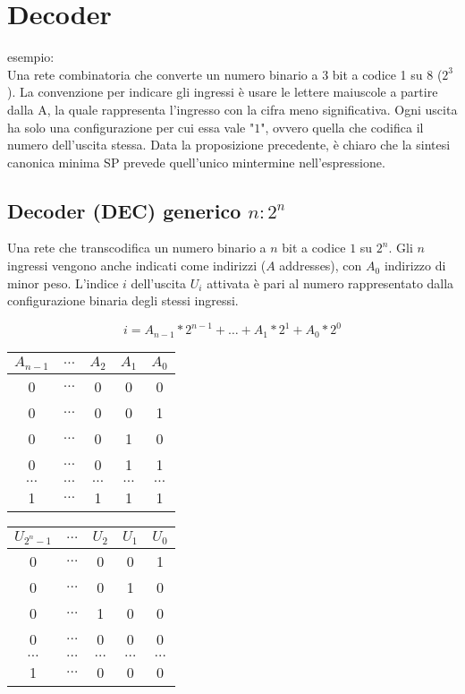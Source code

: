 \documentclass{subfiles}
\begin{document}
\section{Decoder}

esempio:\\

\noindent
Una rete combinatoria che converte un numero binario a 3 bit a codice 1 su 8 ($2^3$).
La convenzione per indicare gli ingressi è usare le lettere maiuscole a partire dalla A, la quale rappresenta l'ingresso con la cifra meno significativa.
Ogni uscita ha solo una configurazione per cui essa vale "$1$", ovvero quella che codifica il numero dell'uscita stessa.
Data la proposizione precedente, è chiaro che la sintesi canonica minima SP prevede quell'unico mintermine nell'espressione.

\subsection{Decoder (DEC) generico $n:2^n$}

Una rete che transcodifica un numero binario a $n$ bit a codice $1$ su $2^n$.
Gli $n$ ingressi vengono anche indicati come indirizzi ($A$ addresses), con $A_0$ indirizzo di minor peso.
L'indice $i$ dell'uscita $U_i$ attivata è pari al numero rappresentato dalla configurazione binaria degli stessi ingressi.

$$
i = A_{n-1} * 2^{n-1} + \dots + A_1 * 2^1 + A_0 * 2^0
$$

\begin{center}
\begin{tabular}{ |c|c|c|c|c| }
\hline
$A_{n-1}$ & $\dots$ & $A_2$ & $A_1$ & $A_0$ \\
\hline
\hline
0 & $\dots$ & 0 & 0 & 0 \\
0 & $\dots$ & 0 & 0 & 1 \\
0 & $\dots$ & 0 & 1 & 0 \\
0 & $\dots$ & 0 & 1 & 1 \\
$\dots$ & $\dots$ & $\dots$ & $\dots$ & $\dots$ \\
1 & $\dots$ & 1 & 1 & 1 \\
\hline
\end{tabular}
\end{center}

\begin{center}
\begin{tabular}{ |c|c|c|c|c| }
\hline
$U_{2^n-1}$ & $\dots$ & $U_2$ & $U_1$ & $U_0$ \\
\hline
\hline
0 & $\dots$ & 0 & 0 & 1 \\
0 & $\dots$ & 0 & 1 & 0 \\
0 & $\dots$ & 1 & 0 & 0 \\
0 & $\dots$ & 0 & 0 & 0 \\
$\dots$ & $\dots$ & $\dots$ & $\dots$ & $\dots$ \\
1 & $\dots$ & 0 & 0 & 0 \\
\hline
\end{tabular}
\end{center}
\end{document}
